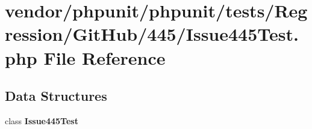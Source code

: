 \section{vendor/phpunit/phpunit/tests/\+Regression/\+Git\+Hub/445/\+Issue445\+Test.php File Reference}
\label{_issue445_test_8php}
\subsection*{Data Structures}
\begin{DoxyCompactItemize}
\item 
class {\bf Issue445\+Test}
\end{DoxyCompactItemize}
